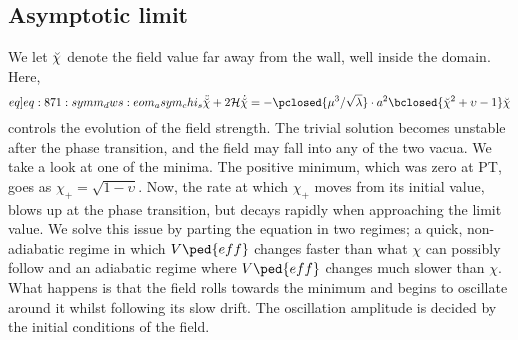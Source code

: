 \subsection{Asymptotic limit}
    We let $\breve{\chi}$ denote the field value far away from the wall, well inside the domain. Here,
    \begin{equation}\label[eq]{eq:871:symm_dws:eom_asym_chi_s}
        \ddot{\brchi} +  2\mathcal{H} \dot{\brchi} = - \pclosed{ \mu^3/\sqrt{\lambda} } \cdot a^2\bclosed{ \brchi^2 + \upsilon - 1 }\brchi
    \end{equation}
    controls the evolution of the field strength. The trivial solution becomes unstable after the phase transition, and the field may fall into any of the two vacua. We take a look at one of the minima. The positive minimum, which was zero at PT, goes as $\chi_+ = \sqrt{1-\upsilon}$. Now, the rate at which $\chi_+$ moves from its initial value, blows up at the phase transition, but decays rapidly when approaching the limit value. We solve this issue by parting the equation in two regimes;  a quick, non-adiabatic regime in which $V\ped{eff}$ changes faster than what $\chi$ can possibly follow and  an adiabatic regime where $V\ped{eff}$ changes much slower than $\chi$. What happens is that the field rolls towards the minimum and begins to oscillate around it whilst following its slow drift.  The oscillation amplitude is decided by the initial conditions of the field.


